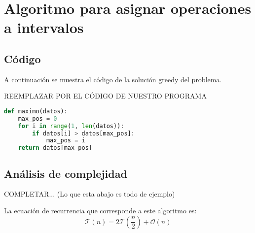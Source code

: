 \section{Algoritmo para asignar operaciones a intervalos}

\subsection{Código}


A continuación se muestra el código de la solución greedy del problema. 

REEMPLAZAR POR EL CÓDIGO DE NUESTRO PROGRAMA

\begin{lstlisting}[language=Python]
def maximo(datos):
    max_pos = 0
    for i in range(1, len(datos)):
        if datos[i] > datos[max_pos]:
            max_pos = i
    return datos[max_pos]
\end{lstlisting}


% 




\subsection{Análisis de complejidad}

COMPLETAR... (Lo que esta abajo es todo de ejemplo)

La ecuación de recurrencia que corresponde a este algoritmo es: 
\begin{equation*} %
    \mathcal{T}(n) = 2 \mathcal{T}\left(\frac{n}{2}\right) + \mathcal{O}(n)
\end{equation*}

